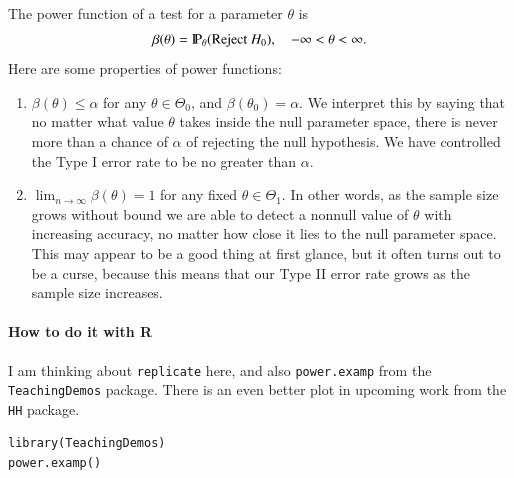 \documentclass[captions=tableheading]{scrbook}
\begin{document}
The power function of a test for a parameter \(\theta\) is
\[
\beta(\theta)=\P_{\theta}(\mbox{Reject }H_{0}),\quad-\infty<\theta<\infty.
\]
Here are some properties of power functions:
\begin{enumerate}
\item \(\beta(\theta)\leq\alpha\) for any \(\theta\in\Theta_{0}\), and \(\beta(\theta_{0})=\alpha\). We interpret this by saying that no matter what value \(\theta\) takes inside the null parameter space, there is never more than a chance of \(\alpha\) of rejecting the null hypothesis. We have controlled the Type I error rate to be no greater than \(\alpha\).
\item \(\lim_{n\to\infty}\beta(\theta)=1\) for any fixed \(\theta\in\Theta_{1}\). In other words, as the sample size grows without bound we are able to detect a nonnull value of \(\theta\) with increasing accuracy, no matter how close it lies to the null parameter space. This may appear to be a good thing at first glance, but it often turns out to be a curse, because this means that our Type II error rate grows as the sample size increases.
\end{enumerate}

\paragraph*{How to do it with \textsf{R}}

I am thinking about \texttt{replicate} here, and also \texttt{power.examp} from the \texttt{TeachingDemos} package. There is an even better plot in upcoming work from the \texttt{HH} package.



\begin{verbatim}
library(TeachingDemos)
power.examp()
\end{verbatim}
\end{document}
